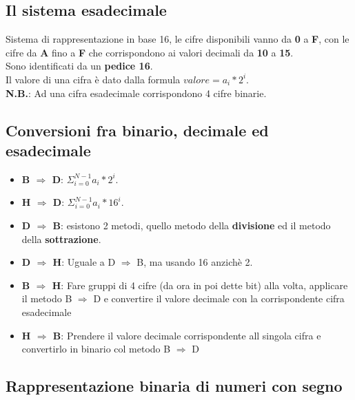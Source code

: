 \documentclass{report}
\begin{document}
    \subsection{Il sistema esadecimale}
        Sistema di rappresentazione in base 16, le cifre disponibili vanno da
        \textbf{0} a \textbf{F}, con le cifre da \textbf{A} fino a \textbf{F}
        che corrispondono ai valori decimali da \textbf{10} a \textbf{15}. \\
        Sono identificati da un \textbf{pedice 16}. \\
        Il valore di una cifra è dato dalla formula $valore = a_i * 2^i$. \\
        \textbf{N.B.}: Ad una cifra esadecimale corrispondono 4 cifre binarie.
    \subsection{Conversioni fra binario, decimale ed esadecimale}
        \begin{itemize}
            \item \textbf{B $\Longrightarrow$ D}: $\Sigma_{i=0}^{N-1} a_i * 2^i$.
            \item \textbf{H $\Longrightarrow$ D}: $\Sigma_{i=0}^{N-1} a_i * 16^i$.
            \item \textbf{D $\Longrightarrow$ B}: esistono 2 metodi, quello metodo della \textbf{divisione} 
                ed il metodo della \textbf{sottrazione}.
            \item \textbf{D $\Longrightarrow$ H}: Uguale a D $\Longrightarrow$ B, ma usando 16 anzichè 2.
            \item \textbf{B $\Longrightarrow$ H}: Fare gruppi di 4 cifre (da ora in poi dette bit) alla volta, 
                applicare il metodo B $\Longrightarrow$ D e convertire il valore decimale 
                con la corrispondente cifra esadecimale
            \item \textbf{H $\Longrightarrow$ B}: Prendere il valore decimale corrispondente all singola cifra e
                convertirlo in binario col metodo B $\Longrightarrow$ D 
        \end{itemize}
    \subsection{Rappresentazione binaria di numeri con segno}
\end{document}
